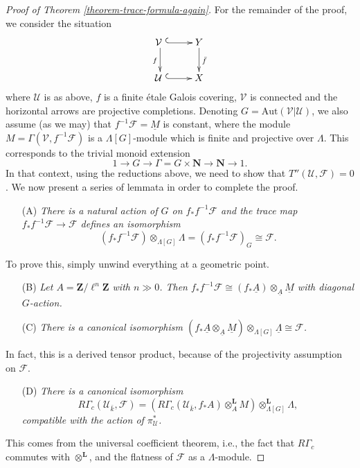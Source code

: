 \begin{proof}[Proof of Theorem \ref{theorem-trace-formula-again}]
\medskip\noindent
For the remainder of the proof, we consider the situation
$$
\xymatrix{
{\mathcal{V} \ } \ar_f[d] \ar@{^(->}[r] & Y \ar^{\bar f}[d] \\	
{\mathcal{U} \ } \ar@{^(->}[r] & X
}
$$
where $\mathcal{U}$ is as above, $f$ is a finite \'etale Galois covering,
$\mathcal{V}$ is connected and the horizontal arrows are projective
completions. Denoting $G=\text{Aut}(\mathcal{V}|\mathcal{U})$, we also assume
(as we may) that $f^{-1}\mathcal{F} =\underline M$ is constant, where the
module $M = \Gamma(\mathcal{V}, f^{-1}\mathcal{F})$ is a $\Lambda[G]$-module
which is finite and projective over $\Lambda$. This corresponds to the trivial
monoid extension
$$
1\to G\to \Gamma=G\times \mathbf{N}\to \mathbf{N}\to 1.
$$
In that context, using the reductions above, we need to show that
$T''(\mathcal{U},\mathcal{F})=0$. We now present a series of lemmata in order
to complete the proof.
\begin{enumerate}
\item[(A)]
{\it There is a natural action of $G$ on $f_*f^{-1}\mathcal{F}$ and the trace
map $f_*f^{-1}\mathcal{F}\to \mathcal{F}$ defines an isomorphism
$$
(f_*f^{-1}\mathcal{F})\otimes_{\Lambda[G]} \Lambda=(f_*f^{-1}\mathcal{F})_G
\cong \mathcal{F}.
$$
}
\end{enumerate}
To prove this, simply unwind everything at a geometric point.
\begin{enumerate}
\item[(B)]
{\it
Let $A=\mathbf{Z}/\ell^n \mathbf{Z}$ with $n\gg 0$. Then $f_*f^{-1}\mathcal{F}
\cong (f_*\underline A)\otimes_{\underline A} \underline M$ with diagonal
$G$-action.
}
\end{enumerate}
\begin{enumerate}
\item[(C)]
{\it There is a canonical isomorphism
$(f_*\underline A \otimes_{\underline A} \underline M)
\otimes_{\Lambda[G]} \underline \Lambda \cong \mathcal{F}$.
}
\end{enumerate}
In fact, this is a derived tensor product, because of the projectivity
assumption on $\mathcal{F}$.
\begin{enumerate}
\item[(D)]
{\it
There is a canonical isomorphism
$$
R\Gamma_c(\mathcal{U}_{\bar k}, \mathcal{F})
= (R\Gamma_c(\mathcal{U}_{\bar k}, f_*A)\otimes_A^\mathbf{L}
M)\otimes_{\Lambda[G]}^\mathbf{L} \Lambda,
$$
compatible with the action of $\pi^*_\mathcal{U}$.
}
\end{enumerate}
This comes from the universal coefficient theorem, i.e., the fact that
$R\Gamma_c$ commutes with $\otimes^\mathbf{L}$, and the flatness of
$\mathcal{F}$ as a $\Lambda$-module.


\end{proof}

